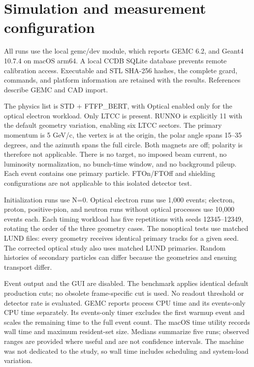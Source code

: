 \FloatBarrier

\section{Simulation and measurement configuration}

All runs use the local gemc/dev module, which reports GEMC 6.2, and Geant4 10.7.4 on macOS arm64. A local CCDB
SQLite database prevents remote calibration access. Executable and STL SHA-256 hashes, the complete gcard,
commands, and platform information are retained with the results. References~\cite{gemc,cad} describe GEMC and
CAD import.

The physics list is STD + FTFP\_BERT, with Optical enabled only for the optical electron workload. Only LTCC is
present. RUNNO is explicitly 11 with the default geometry variation, enabling six LTCC sectors. The primary
momentum is 5 GeV/c, the vertex is at the origin, the polar angle spans 15--35 degrees, and the azimuth spans
the full circle. Both magnets are off; polarity is therefore not applicable. There is no target, no imposed
beam current, no luminosity normalization, no bunch-time window, and no background pileup. Each event contains
one primary particle. FTOn/FTOff and shielding configurations are not applicable to this isolated detector
test.

Initialization runs use N=0. Optical electron runs use 1,000 events; electron, proton, positive-pion, and
neutron runs without optical processes use 10,000 events each. Each timing workload has five repetitions with
seeds 12345--12349, rotating the order of the three geometry cases. The nonoptical tests use matched LUND
files: every geometry receives identical primary tracks for a given seed. The corrected optical study also uses
matched LUND primaries. Random histories of secondary particles can differ because the geometries and ensuing
transport differ.

Event output and the GUI are disabled. The benchmark applies identical default production cuts; no obsolete
frame-specific cut is used. No readout threshold or detector rate is evaluated. GEMC reports process CPU time
and its events-only CPU time separately. Its events-only timer excludes the first warmup event and scales the
remaining time to the full event count. The macOS time utility records wall time and maximum resident-set size.
Medians summarize five runs; observed ranges are provided where useful and are not confidence intervals. The
machine was not dedicated to the study, so wall time includes scheduling and system-load variation.


